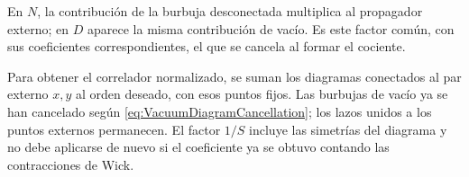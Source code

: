 \documentclass[11pt,letterpaper]{article}
\theoremstyle{definition}
\theoremstyle{definition}
\newcounter{diagrama}
\begin{document}
En $N$, la contribución de la burbuja desconectada multiplica al
propagador externo; en $D$ aparece la misma contribución de vacío.
Es este factor común, con sus coeficientes correspondientes, el que se
cancela al formar el cociente.

Para obtener el correlador normalizado, se suman los diagramas conectados
al par externo $x,y$ al orden deseado, con esos puntos fijos. Las burbujas
de vacío ya se han cancelado según \eqref{eq:VacuumDiagramCancellation};
los lazos unidos a los puntos externos permanecen. El factor $1/S$ incluye
las simetrías del diagrama y no debe aplicarse de nuevo si el coeficiente
ya se obtuvo contando las contracciones de Wick.
\end{document}
